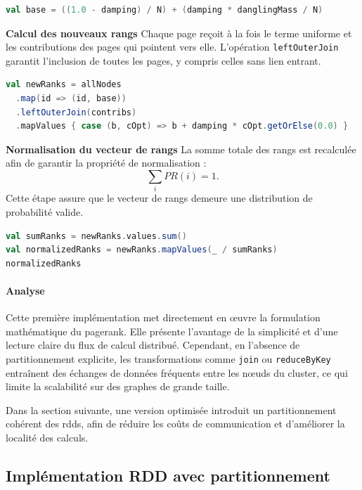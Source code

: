\documentclass[conference]{IEEEtran}
\begin{document}
\begin{lstlisting}[language=Scala]
val base = ((1.0 - damping) / N) + (damping * danglingMass / N)
\end{lstlisting}

\textbf{Calcul des nouveaux rangs}  
Chaque page reçoit à la fois le terme uniforme et les contributions des pages qui pointent vers elle.  
L'opération \texttt{leftOuterJoin} garantit l'inclusion de toutes les pages, y compris celles sans lien entrant.

\begin{lstlisting}[language=Scala]
val newRanks = allNodes
  .map(id => (id, base))
  .leftOuterJoin(contribs)
  .mapValues { case (b, cOpt) => b + damping * cOpt.getOrElse(0.0) }
\end{lstlisting}

\textbf{Normalisation du vecteur de rangs}  
La somme totale des rangs est recalculée afin de garantir la propriété de normalisation :
\[
\sum_i PR(i) = 1.
\]
Cette étape assure que le vecteur de rangs demeure une distribution de probabilité valide.

\begin{lstlisting}[language=Scala]
val sumRanks = newRanks.values.sum()
val normalizedRanks = newRanks.mapValues(_ / sumRanks)
normalizedRanks
\end{lstlisting}

\paragraph{Analyse}

Cette première implémentation met directement en œuvre la formulation mathématique du \gls{pagerank}.  
Elle présente l'avantage de la simplicité et d'une lecture claire du flux de calcul distribué.  
Cependant, en l'absence de partitionnement explicite, les transformations comme \texttt{join} ou \texttt{reduceByKey} entraînent des échanges de données fréquents entre les nœuds du \gls{cluster}, ce qui limite la scalabilité sur des graphes de grande taille.

Dans la section suivante, une version optimisée introduit un partitionnement cohérent des \glspl{rdd}, afin de réduire les coûts de communication et d'améliorer la localité des calculs.

\subsection{Implémentation RDD avec partitionnement}
\end{document}

